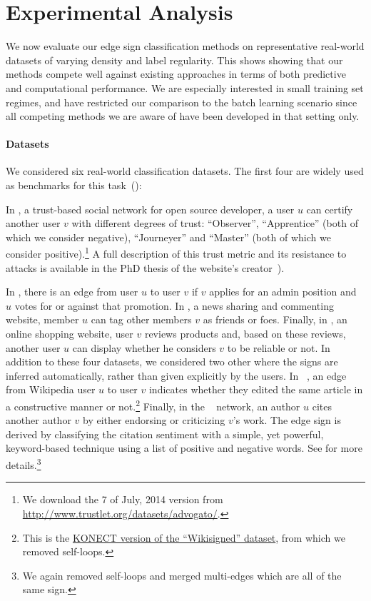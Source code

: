 \section{Experimental Analysis}\label{s:exp}

We now evaluate our edge sign classification methods on representative real-world datasets of
varying density and label regularity. This shows showing that our methods compete well against
existing approaches in terms of both predictive and computational performance. We are especially
interested in small training set regimes, and have restricted our comparison to the batch learning
scenario since all competing methods we are aware of have been developed in that setting only.

\paragraph{Datasets}

We considered six real-world classification datasets. The first four are \dssn{} widely
used as benchmarks for this
task~(\eg{}\autocites{Leskovec2010}{shahriari2014ranking}{wu2016troll}{OnlineCompletion17}):
\begin{newcontent}
In \adv{}, a trust-based social network for open source developer, a user $u$ can certify another
user $v$ with different degrees of trust: \enquote{Observer}, \enquote{Apprentice} (both of which we
consider negative), \enquote{Journeyer} and \enquote{Master} (both of which we consider
positive).\footnote{We download the 7\thup{} of July, 2014 version from
\url{http://www.trustlet.org/datasets/advogato/}.} A full description of this trust metric and its
resistance to attacks is available in the PhD thesis of the website's creator~\autocite[Section
4]{AdvogatoTrustThesis02}).
\end{newcontent}
In \wik{}, there is an edge from user $u$ to user $v$ if $v$ applies for an admin position and $u$
votes for or against that promotion. In \sla{}, a news sharing and commenting website, member $u$
can tag other members $v$ as friends or foes. Finally, in \epi{}, an online shopping website, user
$v$ reviews products and, based on these reviews, another user $u$ can display whether he considers
$v$ to be reliable or not. In addition to these four datasets, we considered two other \ssn{} where
the signs are inferred automatically, rather than given explicitly by the users.  In
\kiw{}~\cite{wikiedits11}, an edge from Wikipedia user $u$ to user $v$ indicates whether they edited
the same article in a constructive manner or not.\footnote{This is the
\href{http://konect.uni-koblenz.de/networks/wikisigned-k2}{KONECT version of the
\enquote{Wikisigned} dataset}, from which we removed self-loops.} Finally, in the
\aut{}~\cite{kumar2016structure} network, an author $u$ cites another author $v$ by either endorsing
or criticizing $v$'s work. The edge sign is derived by classifying the citation sentiment with a
simple, yet powerful, keyword-based technique using a list of positive and negative words. See
\cite{kumar2016structure} for more details.\footnote{We again removed self-loops and merged
multi-edges which are all of the same sign.}

